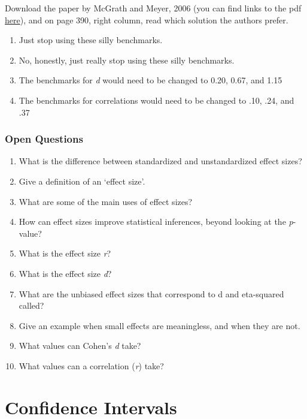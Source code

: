 \documentclass[
  oneside]{krantz}
\providecommand{\tightlist}{%
  \setlength{\itemsep}{0pt}\setlength{\parskip}{0pt}}
\begin{document}
Download the paper by McGrath and Meyer, 2006 (you can find links to the pdf \href{https://scholar.google.com/scholar?cluster=18022919125620514097\&as_sdt=0\%2C5\&inst=1903264034810781805}{here}), and on page 390, right column, read which solution the authors prefer.

\begin{enumerate}
\def\labelenumi{\Alph{enumi})}
\tightlist
\item
  Just stop using these silly benchmarks.
\item
  No, honestly, just really stop using these silly benchmarks.
\item
  The benchmarks for \emph{d} would need to be changed to 0.20, 0.67, and 1.15
\item
  The benchmarks for correlations would need to be changed to .10, .24, and .37
\end{enumerate}

\hypertarget{open-questions-4}{%
\subsection{Open Questions}\label{open-questions-4}}

\begin{enumerate}
\def\labelenumi{\arabic{enumi}.}
\item
  What is the difference between standardized and unstandardized effect sizes?
\item
  Give a definition of an `effect size'.
\item
  What are some of the main uses of effect sizes?
\item
  How can effect sizes improve statistical inferences, beyond looking at the \emph{p}-value?
\item
  What is the effect size \emph{r}?
\item
  What is the effect size \emph{d}?
\item
  What are the unbiased effect sizes that correspond to d and eta-squared called?
\item
  Give an example when small effects are meaningless, and when they are not.
\item
  What values can Cohen's \emph{d} take?
\item
  What values can a correlation (\emph{r}) take?
\end{enumerate}

\hypertarget{confint}{%
\chapter{Confidence Intervals}\label{confint}}
\end{document}
